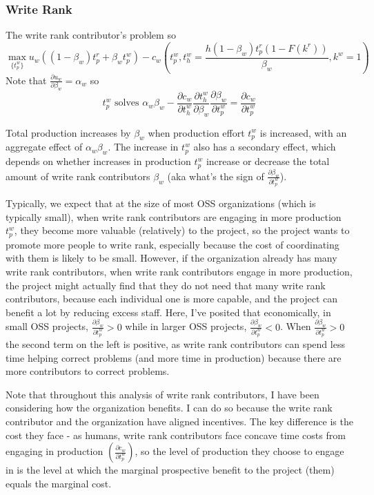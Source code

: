 \documentclass[source/paper/main.tex]{subfiles}
\begin{document}
\subsubsection{Write Rank}
The write rank contributor's problem so
$$\max_{\{t_p^w\}} u_w\left((1-\beta_w) t_p^r + \beta_w t_p^w \right) - c_w\left(t_p^w, t_h^w = \frac{ h (1-\beta_w) t_p^r(1-F(k^r))}{\beta_w}, k^w = 1\right)$$
Note that $\frac{\partial u_w}{\partial \beta_w} = \alpha_w$ 
so $$t_p^w \text{ solves } \alpha_w \beta_w - \frac{\partial c_w}{\partial t_h^w} \frac{\partial t_h^w}{\partial \beta_w}\frac{\partial \beta_w}{\partial t_p^w} = \frac{\partial c_w}{\partial t_p^w} $$

Total production increases by $\beta_w$ when production effort $t_p^w$ is increased, with an aggregate effect of $\alpha_w\beta_w$. The increase in $t_p^w$ also has a secondary effect, which depends on whether increases in production $t_p^w$ increase or decrease the total amount of write rank contributors $\beta_w$ (aka what's the sign of $\frac{\partial \beta_w}{\partial t_p^w}$). 

Typically, we expect that at the size of most OSS organizations (which is typically small), when write rank contributors are engaging in more production $t_p^w$, they become more valuable (relatively) to the project, so the project wants to promote more people to write rank, especially because the cost of coordinating with them is likely to be small. However, if the organization already has many write rank contributors, when write rank contributors engage in more production, the project might actually find that they do not need that many write rank contributors, because each individual one is more capable, and the project can benefit a lot by reducing excess staff. Here, I've posited that economically, in small OSS projects, $\frac{\partial \beta_w}{\partial t_p^w}>0$ while in larger OSS projects, $\frac{\partial \beta_w}{\partial t_p^w}<0$. When $\frac{\partial \beta_w}{\partial t_p^w}>0$ the second term on the left is positive, as write rank contributors can spend less time helping correct problems (and more time in production) because there are more contributors to correct problems. 

Note that throughout this analysis of write rank contributors, I have been considering how the organization benefits. I can do so because the write rank contributor and the organization have aligned incentives. The key difference is the cost they face - as humans, write rank contributors face concave time costs from engaging in production $(\frac{\partial c_w}{\partial t_p^w})$, so the level of production they choose to engage in is the level at which the marginal prospective benefit to the project (them) equals the marginal cost.  
\end{document}
